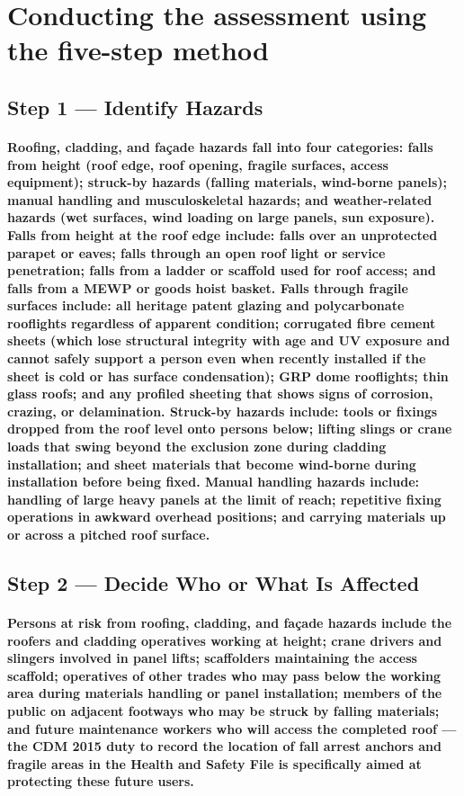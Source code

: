 \section{Conducting the assessment using the five-step method}

\subsection{Step 1 --- Identify Hazards}
\paragraph{Roofing, cladding, and façade hazards fall into four categories: falls from height (roof edge, roof opening, fragile surfaces, access equipment); struck-by hazards (falling materials, wind-borne panels); manual handling and musculoskeletal hazards; and weather-related hazards (wet surfaces, wind loading on large panels, sun exposure). Falls from height at the roof edge include: falls over an unprotected parapet or eaves; falls through an open roof light or service penetration; falls from a ladder or scaffold used for roof access; and falls from a MEWP or goods hoist basket. Falls through fragile surfaces include: all heritage patent glazing and polycarbonate rooflights regardless of apparent condition; corrugated fibre cement sheets (which lose structural integrity with age and UV exposure and cannot safely support a person even when recently installed if the sheet is cold or has surface condensation); GRP dome rooflights; thin glass roofs; and any profiled sheeting that shows signs of corrosion, crazing, or delamination. Struck-by hazards include: tools or fixings dropped from the roof level onto persons below; lifting slings or crane loads that swing beyond the exclusion zone during cladding installation; and sheet materials that become wind-borne during installation before being fixed. Manual handling hazards include: handling of large heavy panels at the limit of reach; repetitive fixing operations in awkward overhead positions; and carrying materials up or across a pitched roof surface.}

\subsection{Step 2 --- Decide Who or What Is Affected}
\paragraph{Persons at risk from roofing, cladding, and façade hazards include the roofers and cladding operatives working at height; crane drivers and slingers involved in panel lifts; scaffolders maintaining the access scaffold; operatives of other trades who may pass below the working area during materials handling or panel installation; members of the public on adjacent footways who may be struck by falling materials; and future maintenance workers who will access the completed roof --- the CDM 2015 duty to record the location of fall arrest anchors and fragile areas in the Health and Safety File is specifically aimed at protecting these future users.}

